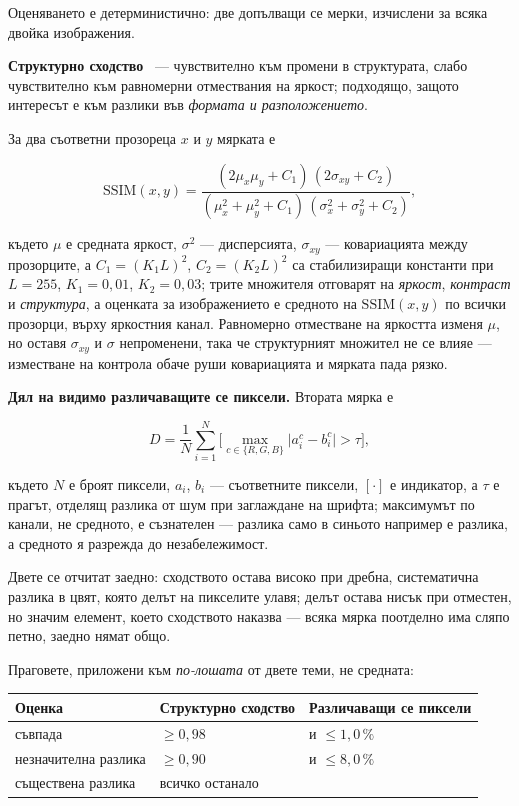 Оценяването е детерминистично: две допълващи се мерки, изчислени за всяка двойка
изображения.

\textbf{Структурно сходство}~\cite{wang2004ssim} --- чувствително към промени в
структурата, слабо чувствително към равномерни отмествания на яркост; подходящо, защото
интересът е към разлики във \emph{формата и разположението}.

За два съответни прозореца $x$ и $y$ мярката е

\begin{equation}
\mathrm{SSIM}(x,y)=\frac{(2\mu_x\mu_y+C_1)\,(2\sigma_{xy}+C_2)}
                        {(\mu_x^{2}+\mu_y^{2}+C_1)\,(\sigma_x^{2}+\sigma_y^{2}+C_2)},
\label{eq:ssim}
\end{equation}

където $\mu$ е средната яркост, $\sigma^{2}$ --- дисперсията, $\sigma_{xy}$ ---
ковариацията между прозорците, а $C_1=(K_1L)^2$, $C_2=(K_2L)^2$ са стабилизиращи
константи при $L=255$, $K_1=0{,}01$, $K_2=0{,}03$; трите множителя отговарят на
\emph{яркост}, \emph{контраст} и \emph{структура}, а оценката за изображението е
средното на $\mathrm{SSIM}(x,y)$ по всички прозорци, върху яркостния канал. Равномерно
отместване на яркостта изменя $\mu$, но оставя $\sigma_{xy}$ и $\sigma$ непроменени,
така че структурният множител не се влияе --- изместване на контрола обаче руши
ковариацията и мярката пада рязко.

\textbf{Дял на видимо различаващите се пиксели.} Втората мярка е

\begin{equation}
D=\frac{1}{N}\sum_{i=1}^{N}
  \Big[\max_{c\in\{R,G,B\}}\big|a_i^{c}-b_i^{c}\big| > \tau\Big],
\label{eq:diff}
\end{equation}

където $N$ е броят пиксели, $a_i$, $b_i$ --- съответните пиксели, $[\cdot]$ е индикатор,
а $\tau$ е прагът, отделящ разлика от шум при заглаждане на шрифта; максимумът по
канали, не средното, е съзнателен --- разлика само в синьото например е разлика, а
средното я разрежда до незабележимост.

Двете се отчитат заедно: сходството остава високо при дребна, систематична разлика в
цвят, която делът на пикселите улавя; делът остава нисък при отместен, но значим
елемент, което сходството наказва --- всяка мярка поотделно има сляпо петно, заедно
нямат общо.

Праговете, приложени към \emph{по-лошата} от двете теми, не средната:

\begin{center}
\begin{tabular}{@{}lll@{}}
\textbf{Оценка} & \textbf{Структурно сходство} & \textbf{Различаващи се пиксели} \\
\hline
съвпада             & $\geq 0{,}98$ & и $\leq 1{,}0\,\%$ \\
незначителна разлика & $\geq 0{,}90$ & и $\leq 8{,}0\,\%$ \\
съществена разлика   & \multicolumn{2}{l}{всичко останало} \\
\end{tabular}
\end{center}


